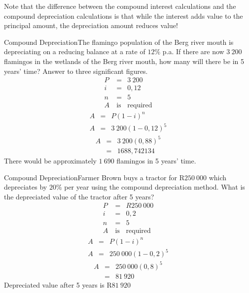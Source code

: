 Note that the difference between the compound interest calculations and the compound depreciation calculations is that while the interest adds value to the principal amount, the depreciation amount reduces value!

\begin{wex}{Compound Depreciation}{The flamingo population of the Berg river mouth is depreciating on a reducing balance at a rate of $12\%$ p.a. If there are now $3~200$ flamingos in the wetlands of the Berg river mouth, how many will there be in 5 years' time? Answer to three significant figures.\\}{
\begin{eqnarray*}
P &=& 3~200\\
i &=& 0,12\\
n &=& 5\\
A~ &\mbox{is}& \mbox{required}
\end{eqnarray*}
\begin{eqnarray*}
A &=& P(1 - i)^n\\
A &=& 3~200(1-0,12)^5
\end{eqnarray*}
\begin{eqnarray*}
A &=& 3~200(0,88)^5\\
&=& 1688,742134
\end{eqnarray*}
}
There would be approximately $1~690$ flamingos in 5 years' time.
\end{wex}

\begin{wex}{Compound Depreciation}{Farmer Brown buys a tractor for R$250~000$ which depreciates by $20\%$ per year using the compound depreciation method. What is the depreciated value of the tractor after 5 years?\\}{
\begin{eqnarray*}
P &=& R250~000\\
i &=& 0,2\\
n &=& 5\\
A~ &\mbox{is}& \mbox{required}
\end{eqnarray*}
\begin{eqnarray*}
A &=& P(1-i)^n\\
A &=& 250~000(1-0,2)^5
\end{eqnarray*}
\begin{eqnarray*}
A &=& 250~000(0,8)^5\\
&=&81~920
\end{eqnarray*}
Depreciated value after 5 years is R$81~920$}
\end{wex}

